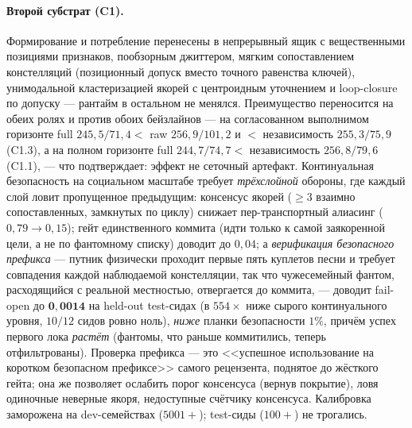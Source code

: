 \documentclass{article}
\begin{document}
\paragraph{Второй субстрат (C1).} Формирование и потребление
перенесены в непрерывный ящик с вещественными позициями признаков,
пообзорным джиттером, мягким сопоставлением констелляций
(позиционный допуск вместо точного равенства ключей), унимодальной
кластеризацией якорей с центроидным уточнением и loop-closure по
допуску --- рантайм в остальном не менялся. Преимущество переносится
на обеих ролях и против обоих бейзлайнов --- на согласованном
выполнимом горизонте full $245{,}5/71{,}4 <$ raw $256{,}9/101{,}2$ и
$<$ независимость $255{,}3/75{,}9$ (C1.3), а на полном горизонте full
$244{,}7/74{,}7 <$ независимость $256{,}8/79{,}6$ (C1.1), --- что
подтверждает: эффект не сеточный артефакт. Континуальная безопасность
на социальном масштабе требует \emph{трёхслойной} обороны, где каждый
слой ловит пропущенное предыдущим: консенсус якорей ($\ge 3$ взаимно
сопоставленных, замкнутых по циклу) снижает пер-транспортный алиасинг
($0{,}79 \to 0{,}15$); гейт единственного коммита (идти только к самой
заякоренной цели, а не по фантомному списку) доводит до $0{,}04$; а
\emph{верификация безопасного префикса} --- путник физически проходит
первые пять куплетов песни и требует совпадения каждой наблюдаемой
констелляции, так что чужесемейный фантом, расходящийся с реальной
местностью, отвергается до коммита, --- доводит fail-open до
$\mathbf{0{,}0014}$ на held-out test-сидах (в $554\times$ ниже сырого
континуального уровня, $10/12$ сидов ровно ноль), \emph{ниже} планки
безопасности $1\%$, причём успех первого лока \emph{растёт} (фантомы,
что раньше коммитились, теперь отфильтрованы). Проверка префикса ---
это <<успешное использование на коротком безопасном префиксе>> самого
рецензента, поднятое до жёсткого гейта; она же позволяет ослабить
порог консенсуса (вернув покрытие), ловя одиночные неверные якоря,
недоступные счётчику консенсуса. Калибровка заморожена на
dev-семействах ($5001{+}$); test-сиды ($100{+}$) не трогались.
\end{document}
